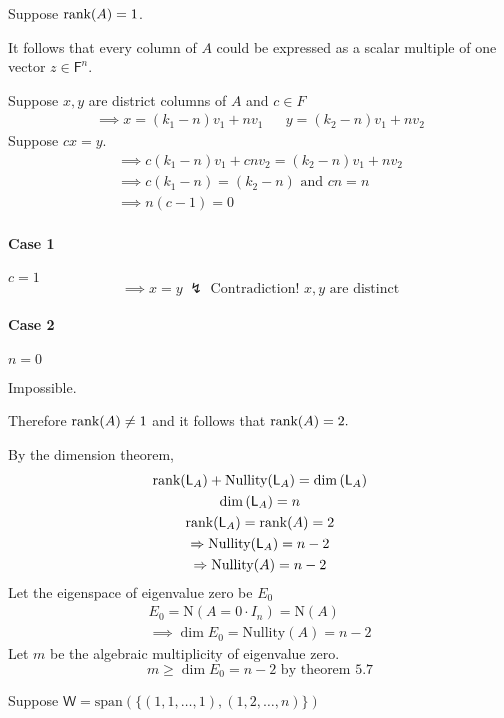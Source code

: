 Suppose $\text{rank}({A})=1$.

It follows that every column of $A$ could be expressed as a scalar
multiple of one vector $z \in \mathsf{F}^n.$

Suppose $x,y$ are district columns of $A$ and $c \in F$  
\begin{align}
\implies x = (k_1 -n)v_1 + nv_1 & & y = (k_2 -n)v_1 + nv_2
\end{align}
Suppose $cx= y$.
\begin{gather}
\implies c(k_1-n)v_1 + cnv_2  = (k_2 -n)v_1 + nv_2\\
\implies c(k_1-n) = (k_2 - n) \text{ and } cn =n\\
\implies n(c-1) = 0
\end{gather}
\paragraph{Case 1} $c=1$
\begin{equation}
\implies x = y \;\lightning \text{ Contradiction! } x,y \text{ are distinct}
\end{equation}
\paragraph{Case 2} $n=0$

Impossible.

Therefore $\text{rank}({A}) \neq 1$ and it follows that $\text{rank}({A}) = 2.$

By the dimension theorem,
\begin{gather}
\text{rank}({\mathsf{L}_A}) + \text{Nullity}(\mathsf{L}_A) =
\dim{(\mathsf{L}_A)}\\
\dim{(\mathsf{L}_A)} = n\\
\text{rank}({\mathsf{L}_A}) = \text{rank}({A}) = 2\\
\Rightarrow \text{Nullity}(\mathsf{L}_A) = n -2\\
\Rightarrow \text{Nullity}(A) = n-2
\end{gather}
Let the eigenspace of eigenvalue zero be $E_0$
\begin{gather}
E_0 = \text{N}(A = 0 \cdot I_n) = \text{N}(A)\\
\implies \dim{E_0} = \text{Nullity}(A) = n-2
\end{gather}
Let $m$ be the algebraic multiplicity of eigenvalue zero.
\begin{equation}
m \geq \dim{E_0} = n - 2 \text{ by theorem 5.7}
\end{equation}

Suppose $\mathsf{W} = \text{span}(\{(1,1,\dotsc,1),(1,2,\dotsc,n)\})$

